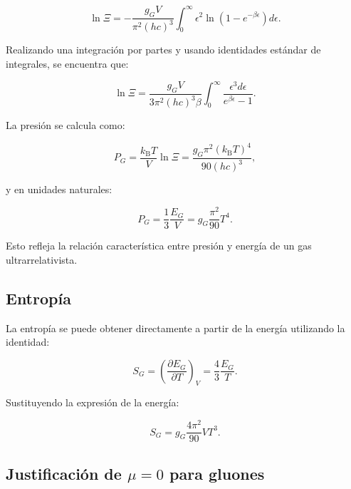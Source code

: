 \begin{equation}
\ln \Xi = -\frac{g_G V}{\pi^2 (hc)^3} \int_0^\infty \epsilon^2 \ln(1 - e^{-\beta\epsilon}) d\epsilon.
\end{equation}

Realizando una integración por partes y usando identidades estándar de integrales, se encuentra que:

\begin{equation}
\ln \Xi = \frac{g_G V}{3\pi^2 (hc)^3 \beta} \int_0^\infty \frac{\epsilon^3 d\epsilon}{e^{\beta\epsilon} - 1}.
\end{equation}

La presión se calcula como:

\begin{equation}
P_G = \frac{{k}_{\mathrm{B}} T}{V} \ln \Xi = \frac{g_G \pi^2 ({k}_{\mathrm{B}} T)^4}{90 (hc)^3},
\end{equation}

y en unidades naturales:

\begin{equation}
P_G = \frac{1}{3} \frac{E_G}{V} = g_G \frac{\pi^2}{90} T^4.
\end{equation}

Esto refleja la relación característica entre presión y energía de un gas ultrarrelativista.


\subsection{Entropía}
\label{app:BE-Entropy}

La entropía se puede obtener directamente a partir de la energía utilizando la identidad:

\begin{equation}
S_G = \left( \frac{\partial E_G}{\partial T} \right)_{V} = \frac{4}{3} \frac{E_G}{T}.
\end{equation}

Sustituyendo la expresión de la energía:

\begin{equation}
S_G = g_G \frac{4\pi^2}{90} V T^3.
\end{equation}


\subsection{Justificación de \(\mu = 0\) para gluones}

